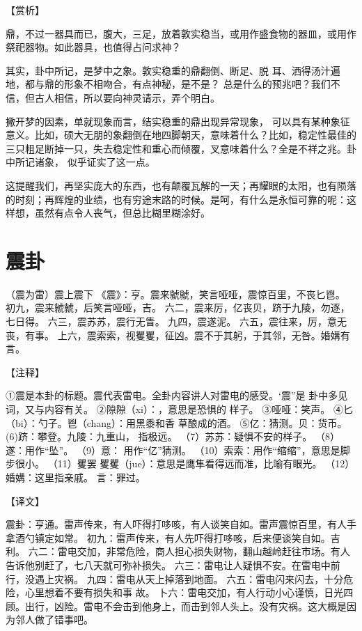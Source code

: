 \documentclass[12pt,UTF8]{ctexbook}
\begin{document}
【赏析】

鼎，不过一器具而已，腹大，三足，放着敦实稳当，或用作盛食物的器皿，或用作祭祀器物。如此器具，也值得占问求神？

其实，卦中所记，是梦中之象。敦实稳重的鼎翻倒、断足、脱 耳、洒得汤汁遍地，都与鼎的形象不相吻合，有点神秘，是不是？ 总是什么的预兆吧？我们不信，但古人相信，所以要向神灵请示，弄个明白。

撇开梦的因素，单就现象而言，结实稳重的鼎出现异常现象， 可以具有某种象征意义。比如，硕大无朋的象翻倒在地四脚朝天，意味着什么？比如，稳定性最佳的三只粗足断掉一只，失去稳定性和重心而倾覆，叉意味着什么？全是不祥之兆。卦中所记诸象， 似乎证实了这一点。

这提醒我们，再坚实庞大的东西，也有颠覆瓦解的一天；再耀眼的太阳，也有陨落的时刻；再辉煌的业绩，也有穷途末路的时候。是呵，有什么是永恒可靠的呢：这样想，虽然有点令人丧气，但总比糊里糊涂好。

\chapter{震卦}

（震为雷）震上震下
《震》：亨。震来虩虩，笑言哑哑，震惊百里，不丧匕鬯。
初九，震来虩虩，后笑言哑哑，吉。
六二，震来厉，亿丧贝，跻于九陵，勿逐，七日得。
六三，震苏苏，震行无眚。
九四，震遂泥。
六五，震往来，厉，意无丧，有事。
上六，震索索，视矍矍，征凶。震不于其躬，于其邻，无咎。婚媾有言。

【注释】

①震是本卦的标题。震代表雷电。全卦内容讲人对雷电的感受。‘震”是 卦中多见词，又与内容有关。
②隙隙（xi）：，意思是恐惧的 样子。
③哑哑：笑声。
④匕（bi）：勺子。鬯（chang）：用黑黍和香 草酿成的酒。
⑤亿：猜测。贝：货币。
(6)跻：攀登。九陵：九重山， 指极远。
（7）苏苏：疑惧不安的样子。
（8）遂：用作“坠”。
（9）意： 用作“亿”猜测。
（10）索索：用作“缩缩”，意思是脚步很小。
（11）矍罢 矍矍（jue）：意思是鹰隼看得远而准，比喻有眼光。
（12）婚媾：这里指亲戚。 言：罪过。

【译文】

震卦：亨通。雷声传来，有人吓得打哆咳，有人谈笑自如。雷声震惊百里，有人手拿酒勺镇定如常。
初九：雷声传来，有人先吓得打哆咳，后来便谈笑自如。吉利。
六二：雷电交加，非常危险，商人担心损失财物，翻山越岭赶往市场。有人告诉他别赶了，七八天就可弥补损失。
六三：雷电让人疑惧不安。在雷电中前行，没遇上灾祸。
九四：雷电从天上掉落到地面。 六五：雷电闪来闪去，十分危险，心里想着不要有损失和事 故。
卜六：雷电交加，有人行动小心谨慎，日光四顾。出行，凶险。雷电不会击到他身上，而击到邻人头上。没有灾祸。这大概是因为邻人做了错事吧。
\end{document}
